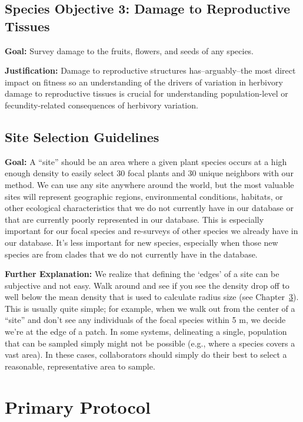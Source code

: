 \documentclass[
  letterpaper,
  DIV=11,
  numbers=noendperiod]{scrreprt}
\begin{document}
\section{Species Objective 3: Damage to Reproductive
Tissues}\label{species-objective-3-damage-to-reproductive-tissues}

\textbf{Goal: }Survey damage to the fruits, flowers, and seeds of any
species.

\textbf{Justification:} Damage to reproductive structures
has--arguably--the most direct impact on fitness so an understanding of
the drivers of variation in herbivory damage to reproductive tissues is
crucial for understanding population-level or fecundity-related
consequences of herbivory variation.

\section{Site Selection Guidelines}\label{site-selection-guidelines}

\textbf{Goal:} A ``site'' should be an area where a given plant species
occurs at a high enough density to easily select 30 focal plants and 30
unique neighbors with our method. We can use any site anywhere around
the world, but the most valuable sites will represent geographic
regions, environmental conditions, habitats, or other ecological
characteristics that we do not currently have in our database or that
are currently poorly represented in our database. This is especially
important for our focal species and re-surveys of other species we
already have in our database. It's less important for new species,
especially when those new species are from clades that we do not
currently have in the database.

\textbf{Further Explanation:} We realize that defining the `edges' of a
site can be subjective and not easy. Walk around and see if you see the
density drop off to well below the mean density that is used to
calculate radius size (see Chapter~\ref{sec-primary}). This is usually
quite simple; for example, when we walk out from the center of a
``site'' and don't see any individuals of the focal species within 5 m,
we decide we're at the edge of a patch. In some systems, delineating a
single, population that can be sampled simply might not be possible
(e.g., where a species covers a vast area). In these cases,
collaborators should simply do their best to select a reasonable,
representative area to sample.

\chapter{Primary Protocol}\label{sec-primary}
\end{document}
